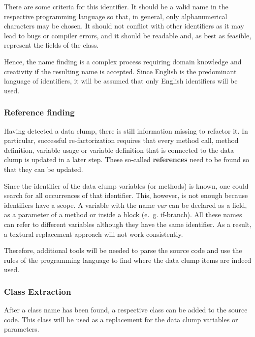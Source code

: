 There are some criteria for this identifier. It should be a valid name in the respective programming language so that, in general, only alphanumerical characters may be chosen. It should not conflict with other identifiers as it may lead to bugs or compiler errors, and it should be readable and, as best as feasible, represent the fields of the class.

Hence, the name finding is a complex process requiring domain knowledge and creativity if the resulting name is accepted. 
Since English is the predominant language of identifiers, it will be assumed that only English identifiers will be used. 

\subsubsection{Reference finding}
 Having detected a data clump, there is still information missing to refactor it. In particular, successful re-factorization requires that every method call, method definition, variable usage or variable definition that is connected to the data clump is updated in a later step. These so-called \textbf{references} need to be found so that they can be updated.

Since the identifier of the data clump variables (or methods) is known, one could search for all occurrences of that identifier. This, however, is not enough because identifiers have a scope. A variable with the name \textit{var} can be declared as a field, as a parameter of a method or inside a block (e.~g. if-branch). All these names can refer to different variables although they have the same identifier. As a result, a textural replacement approach will not work consistently.

Therefore, additional tools will be needed to parse the source code and use the rules of the programming language to find where the data clump items are indeed used.
\subsubsection{Class Extraction}\label{subsec:chap3_data_class_extraction}
After a class name has been found, a respective class can be added to the source code. This class will be used as a replacement for the data clump variables or parameters. 

